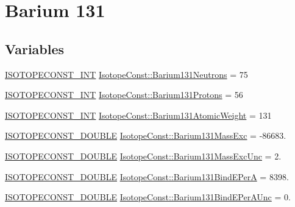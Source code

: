 \hypertarget{group___isotope_const-_barium-_ba131}{}\section{Barium 131}
\label{group___isotope_const-_barium-_ba131}
\subsection*{Variables}
\begin{DoxyCompactItemize}
\item 
\mbox{\hyperlink{group___isotope_const-_macros_ga5f18360b3e99483a35c32d789e62621c}{I\+S\+O\+T\+O\+P\+E\+C\+O\+N\+S\+T\+\_\+\+I\+NT}} \mbox{\hyperlink{group___isotope_const-_barium-_ba131_gab56e5e1fea2c675b40477dbea246a146}{Isotope\+Const\+::\+Barium131\+Neutrons}} = 75
\item 
\mbox{\hyperlink{group___isotope_const-_macros_ga5f18360b3e99483a35c32d789e62621c}{I\+S\+O\+T\+O\+P\+E\+C\+O\+N\+S\+T\+\_\+\+I\+NT}} \mbox{\hyperlink{group___isotope_const-_barium-_ba131_ga87397d89332af7cf3e1309cd711dd0dc}{Isotope\+Const\+::\+Barium131\+Protons}} = 56
\item 
\mbox{\hyperlink{group___isotope_const-_macros_ga5f18360b3e99483a35c32d789e62621c}{I\+S\+O\+T\+O\+P\+E\+C\+O\+N\+S\+T\+\_\+\+I\+NT}} \mbox{\hyperlink{group___isotope_const-_barium-_ba131_gaa907e062b44f8d87604614bd0032ed35}{Isotope\+Const\+::\+Barium131\+Atomic\+Weight}} = 131
\item 
\mbox{\hyperlink{group___isotope_const-_macros_ga8f45a7272ce02c0b4c65c44636ed719a}{I\+S\+O\+T\+O\+P\+E\+C\+O\+N\+S\+T\+\_\+\+D\+O\+U\+B\+LE}} \mbox{\hyperlink{group___isotope_const-_barium-_ba131_ga5391e092fd83069ec2b8cf212bec715c}{Isotope\+Const\+::\+Barium131\+Mass\+Exc}} = -\/86683.
\item 
\mbox{\hyperlink{group___isotope_const-_macros_ga8f45a7272ce02c0b4c65c44636ed719a}{I\+S\+O\+T\+O\+P\+E\+C\+O\+N\+S\+T\+\_\+\+D\+O\+U\+B\+LE}} \mbox{\hyperlink{group___isotope_const-_barium-_ba131_ga5075c07f04bf677d34ece324b5a09f40}{Isotope\+Const\+::\+Barium131\+Mass\+Exc\+Unc}} = 2.
\item 
\mbox{\hyperlink{group___isotope_const-_macros_ga8f45a7272ce02c0b4c65c44636ed719a}{I\+S\+O\+T\+O\+P\+E\+C\+O\+N\+S\+T\+\_\+\+D\+O\+U\+B\+LE}} \mbox{\hyperlink{group___isotope_const-_barium-_ba131_ga42003ba91515acc3ea9ca3d57e4647c2}{Isotope\+Const\+::\+Barium131\+Bind\+E\+PerA}} = 8398.
\item 
\mbox{\hyperlink{group___isotope_const-_macros_ga8f45a7272ce02c0b4c65c44636ed719a}{I\+S\+O\+T\+O\+P\+E\+C\+O\+N\+S\+T\+\_\+\+D\+O\+U\+B\+LE}} \mbox{\hyperlink{group___isotope_const-_barium-_ba131_ga33546744cb69be48f0c45d634c8be0cb}{Isotope\+Const\+::\+Barium131\+Bind\+E\+Per\+A\+Unc}} = 0.

\end{DoxyCompactItemize}
